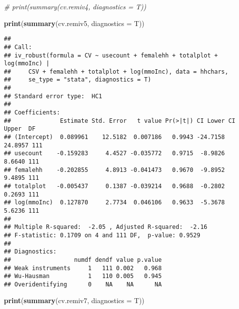 \documentclass[
]{article}
\newenvironment{Shaded}{\begin{snugshade}}{\end{snugshade}}
\newcommand{\CommentTok}[1]{\textcolor[rgb]{0.56,0.35,0.01}{\textit{#1}}}
\newcommand{\DataTypeTok}[1]{\textcolor[rgb]{0.13,0.29,0.53}{#1}}
\newcommand{\KeywordTok}[1]{\textcolor[rgb]{0.13,0.29,0.53}{\textbf{#1}}}
\newcommand{\NormalTok}[1]{#1}
\begin{document}
\begin{Shaded}
\begin{Highlighting}[]
\CommentTok{# print(summary(cv.remiv4, diagnostics = T))}
\end{Highlighting}
\end{Shaded}

\pagebreak

\begin{Shaded}
\begin{Highlighting}[]
\KeywordTok{print}\NormalTok{(}\KeywordTok{summary}\NormalTok{(cv.remiv5, }\DataTypeTok{diagnostics =}\NormalTok{ T))}
\end{Highlighting}
\end{Shaded}

\begin{verbatim}
## 
## Call:
## iv_robust(formula = CV ~ usecount + femalehh + totalplot + log(mmoInc) | 
##     CSV + femalehh + totalplot + log(mmoInc), data = hhchars, 
##     se_type = "stata", diagnostics = T)
## 
## Standard error type:  HC1 
## 
## Coefficients:
##              Estimate Std. Error   t value Pr(>|t|) CI Lower CI Upper  DF
## (Intercept)  0.089961    12.5182  0.007186   0.9943 -24.7158  24.8957 111
## usecount    -0.159283     4.4527 -0.035772   0.9715  -8.9826   8.6640 111
## femalehh    -0.202855     4.8913 -0.041473   0.9670  -9.8952   9.4895 111
## totalplot   -0.005437     0.1387 -0.039214   0.9688  -0.2802   0.2693 111
## log(mmoInc)  0.127870     2.7734  0.046106   0.9633  -5.3678   5.6236 111
## 
## Multiple R-squared:  -2.05 , Adjusted R-squared:  -2.16 
## F-statistic: 0.1709 on 4 and 111 DF,  p-value: 0.9529
## 
## Diagnostics:
##                  numdf dendf value p.value
## Weak instruments     1   111 0.002   0.968
## Wu-Hausman           1   110 0.005   0.945
## Overidentifying      0    NA    NA      NA
\end{verbatim}

\pagebreak

\begin{Shaded}
\begin{Highlighting}[]
\KeywordTok{print}\NormalTok{(}\KeywordTok{summary}\NormalTok{(cv.remiv7, }\DataTypeTok{diagnostics =}\NormalTok{ T))}
\end{Highlighting}
\end{Shaded}
\end{document}
